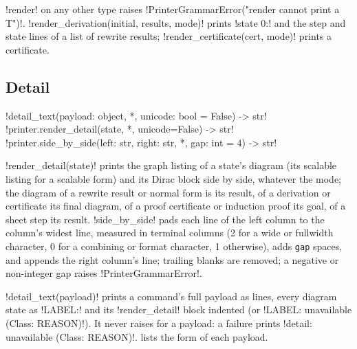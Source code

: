 \py!render! on any other type raises \code!PrinterGrammarError("render cannot print a T")!. \py!render_derivation(initial, results, mode)! prints \code!state 0:! and the step and state lines of a list of rewrite results; \py!render_certificate(cert, mode)! prints a certificate.

\subsection{Detail}

\begin{signature}
\py!detail_text(payload: object, *, unicode: bool = False) -> str!\\
\py!printer.render_detail(state, *, unicode=False) -> str!\\
\py!printer.side_by_side(left: str, right: str, *, gap: int = 4) -> str!
\end{signature}

\py!render_detail(state)! prints the graph listing of a state's diagram (its scalable listing for a scalable form) and its Dirac block side by side, whatever the mode; the diagram of a rewrite result or normal form is its result, of a derivation or certificate its final diagram, of a proof certificate or induction proof its goal, of a sheet step its result. \py!side_by_side! pads each line of the left column to the column's widest line, measured in terminal columns (2 for a wide or fullwidth character, 0 for a combining or format character, 1 otherwise), adds \texttt{gap} spaces, and appends the right column's line; trailing blanks are removed; a negative or non-integer gap raises \py!PrinterGrammarError!.

\py!detail_text(payload)! prints a command's full payload as lines, every diagram state as \code!LABEL:! and its \py!render_detail! block indented (or \code!LABEL: unavailable (Class: REASON)!). It never raises for a payload: a failure prints \code!detail: unavailable (Class: REASON)!.  lists the form of each payload.

